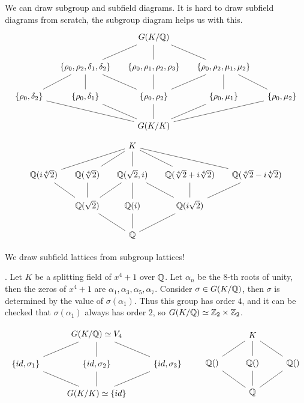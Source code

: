We can draw subgroup and subfield diagrams. It is hard to draw subfield diagrams from scratch, the subgroup diagram helps us with this.
\[
    \begin{tikzcd}[column sep=small]
        & & G(K/\Q) \arrow[dash]{d} \arrow[dash]{dl} \arrow[dash]{dr} & & \\
        & \{\rho_0, \rho_2, \delta_1, \delta_2\} \arrow[dash]{d} \arrow[dash]{dl} \arrow[dash]{dr} & \{\rho_0, \rho_1, \rho_2, \rho_3\} \arrow[dash]{d} & \{\rho_0, \rho_2, \mu_1, \mu_2\} \arrow[dash]{d} \arrow[dash]{dr} \arrow[dash]{dl} & \\
        \{\rho_0, \delta_2\} & \{\rho_0, \delta_1\} & \{\rho_0, \rho_2\} & \{\rho_0, \mu_1\} & \{\rho_0, \mu_2\} \\
        & & G(K/K) \arrow[dash]{u} \arrow[dash]{ul} \arrow[dash]{ur} \arrow[dash]{ull} \arrow[dash]{urr} & &
    \end{tikzcd}
\]
\[
    \begin{tikzcd}[column sep=small]
        & & K \arrow[dash]{d} \arrow[dash]{dl} \arrow[dash]{dr} \arrow[dash]{dll} \arrow[dash]{drr} & & \\
        \Q(i\sqrt[4]{2}) & \Q(\sqrt[4]{2}) & \Q(\sqrt{2}, i) & \Q(\sqrt[4]{2} + i\sqrt[4]{2}) & \Q(\sqrt[4]{2} - i\sqrt[4]{2}) \\
        & \Q(\sqrt{2}) \arrow[dash]{u} \arrow[dash]{ul} \arrow[dash]{ur} & \Q(i) \arrow[dash]{u} & \Q(i\sqrt{2}) \arrow[dash]{u} \arrow[dash]{ur} \arrow[dash]{ul} & \\
        & & \Q \arrow[dash]{u} \arrow[dash]{ul} \arrow[dash]{ur} & &
    \end{tikzcd}
\]

We draw subfield lattices from subgroup lattices!

\ex. Let \(K\) be a splitting field of \(x^4 + 1\) over \(\mathbb{Q}\). Let \(\alpha_n\) be the \(8\)-th roots of unity, then the zeros of \(x^4 + 1\) are \(\alpha_1, \alpha_3, \alpha_5, \alpha_7\). Consider \(\sigma \in G(K/\mathbb{Q})\), then \(\sigma\) is determined by the value of \(\sigma(\alpha_1)\). Thus this group has order \(4\), and it can be checked that \(\sigma(\alpha_1)\) always has order \(2\), so \(G(K/\mathbb{Q}) \simeq \mathbb{Z}_2 \times \mathbb{Z}_2\).

\[
    \begin{tikzcd}
        & G(K/\Q) \simeq V_4 \arrow[dash]{d} \arrow[dash]{dl} \arrow[dash]{dr} & \\
        \{id, \sigma_1\} & \{id, \sigma_2\} & \{id, \sigma_3\} \\
        & G(K/K) \simeq \{id\} \arrow[dash]{u} \arrow[dash]{ul} \arrow[dash]{ur} & \\
    \end{tikzcd}
    \qquad
    \begin{tikzcd}
        & K \arrow[dash]{d} \arrow[dash]{dl} \arrow[dash]{dr} & \\
        \Q() & \Q() & \Q() \\
        & \Q \arrow[dash]{u} \arrow[dash]{ul} \arrow[dash]{ur}& \\
    \end{tikzcd}
\]

